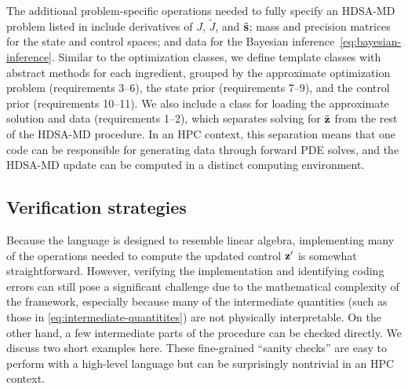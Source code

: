 %
%

The additional problem-specific operations needed to fully specify an HDSA-MD problem listed in  include derivatives of $J$, $\tilde{J}$, and $\tilde{\mathbf{s}}$; mass and precision matrices for the state and control spaces; and data for the Bayesian inference~\cref{eq:bayesian-inference}.
Similar to the optimization classes, we define template classes with abstract methods for each ingredient, grouped by the approximate optimization problem (requirements 3--6), the state prior (requirements 7--9), and the control prior (requirements 10--11).
We also include a class for loading the approximate solution and data (requirements 1--2), which separates solving for $\tilde{\mathbf{z}}$ from the rest of the HDSA-MD procedure.
In an HPC context, this separation means that one code can be responsible for generating data through forward PDE solves, and the HDSA-MD update can be computed in a distinct computing environment.

\subsection{Verification strategies}

Because the \MATLAB language is designed to resemble linear algebra, implementing many of the operations needed to compute the updated control $\mathbf{z}'$ is somewhat straightforward.
However, verifying the implementation and identifying coding errors can still pose a significant challenge due to the mathematical complexity of the framework, especially because many of the intermediate quantities (such as those in \cref{eq:intermediate-quantitites}) are not physically interpretable.
On the other hand, a few intermediate parts of the procedure can be checked directly.
We discuss two short examples here. 
These fine-grained ``sanity checks'' are easy to perform with a high-level language but can be surprisingly nontrivial in an HPC context.

